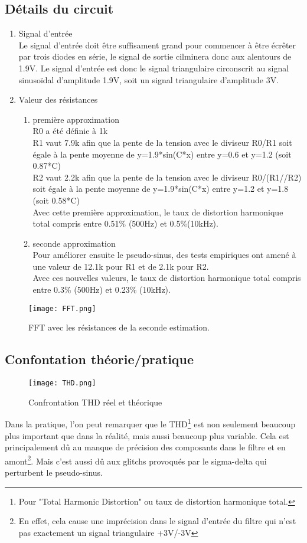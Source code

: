 \subsection{Détails du circuit}
\begin{enumerate}
\item Signal d'entrée\\
Le signal d'entrée doit être suffisament grand pour commencer à être écrêter par trois diodes en série, le signal de sortie cilminera donc aux alentours de 1.9V. Le signal d'entrée est donc le signal triangulaire circonscrit au signal sinusoïdal d'amplitude 1.9V, soit un signal triangulaire d'amplitude 3V.
\item Valeur des résistances\\
\begin{enumerate}
\item première approximation\\
R0 a été définie à 1k\\
R1 vaut 7.9k afin que la pente de la tension avec le diviseur R0/R1 soit égale à la pente moyenne de y=1.9*sin(C*x) entre y=0.6 et y=1.2 (soit 0.87*C)\\
R2 vaut 2.2k afin que la pente de la tension avec le diviseur R0/(R1//R2) soit égale à la pente moyenne de y=1.9*sin(C*x) entre y=1.2 et y=1.8 (soit 0.58*C)\\
Avec cette première approximation, le taux de distortion harmonique total compris entre 0.51\% (500Hz) et 0.5\%(10kHz).
\item seconde approximation\\
Pour améliorer ensuite le pseudo-sinus, des tests empiriques ont amené à une valeur de 12.1k pour R1 et de 2.1k pour R2.\\
Avec ces nouvelles valeurs, le taux de distortion harmonique total compris entre 0.3\% (500Hz) et 0.23\% (10kHz).
\end{enumerate}

\end{enumerate}

\begin{figure}[h]
\centering
\texttt{[image: FFT.png]}
\caption{FFT avec les résistances de la seconde estimation.}
\end{figure}
\subsection{Confontation théorie/pratique}
\begin{figure}[h]
\centering
\texttt{[image: THD.png]}
\caption{Confrontation THD réel et théorique}
\end{figure}
Dans la pratique, l'on peut remarquer que le THD\footnote{Pour "Total Harmonic Distortion" ou taux de distortion harmonique total.} est non seulement beaucoup plus important que dans la réalité, mais aussi beaucoup plus variable. Cela est principalement dû au manque de précision des composants dans le filtre et en amont\footnote{En effet, cela cause une imprécision dans le signal d'entrée du filtre qui n'est pas exactement un signal triangulaire +3V/-3V}. Mais c'est aussi dû aux glitchs provoqués par le sigma-delta qui perturbent le pseudo-sinus.
